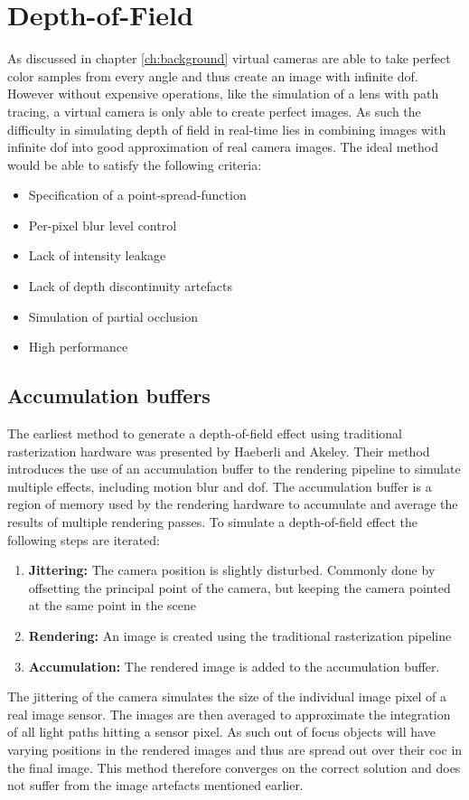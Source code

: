 \chapter{Depth-of-Field}
As discussed in chapter \ref{ch:background} virtual cameras are able to take perfect color samples from every angle and thus create an image with infinite \gls{dof}.
However without expensive operations, like the simulation of a lens with path tracing, a virtual camera is only able to create perfect images.
As such the difficulty in simulating depth of field in real-time lies in combining images with infinite \gls{dof} into good approximation of real camera images.
The ideal method would be able to satisfy the following criteria:
\begin{itemize}
    \item Specification of a point-spread-function
    \item Per-pixel blur level control
    \item Lack of intensity leakage
    \item Lack of depth discontinuity artefacts
    \item Simulation of partial occlusion
    \item High performance
\end{itemize}


\section{Accumulation buffers}
The earliest method to generate a depth-of-field effect using traditional rasterization hardware was presented by Haeberli and Akeley. \cite{Haeberli.1990}
Their method introduces the use of an accumulation buffer to the rendering pipeline to simulate multiple effects, including motion blur and \gls{dof}.
The accumulation buffer is a region of memory used by the rendering hardware to accumulate and average the results of multiple rendering passes.
To simulate a depth-of-field effect the following steps are iterated:
\begin{enumerate}
    \item \textbf{Jittering:} The camera position is slightly disturbed. Commonly done by offsetting the principal point of the camera, but keeping the camera pointed at the same point in the scene
    \item \textbf{Rendering:} An image is created using the traditional rasterization pipeline
    \item \textbf{Accumulation:} The rendered image is added to the accumulation buffer.
\end{enumerate}
The jittering of the camera simulates the size of the individual image pixel of a real image sensor.
The images are then averaged to approximate the integration of all light paths hitting a sensor pixel.
As such out of focus objects will have varying positions in the rendered images and thus are spread out over their \gls{coc} in the final image.
This method therefore converges on the correct solution and does not suffer from the image artefacts mentioned earlier.

